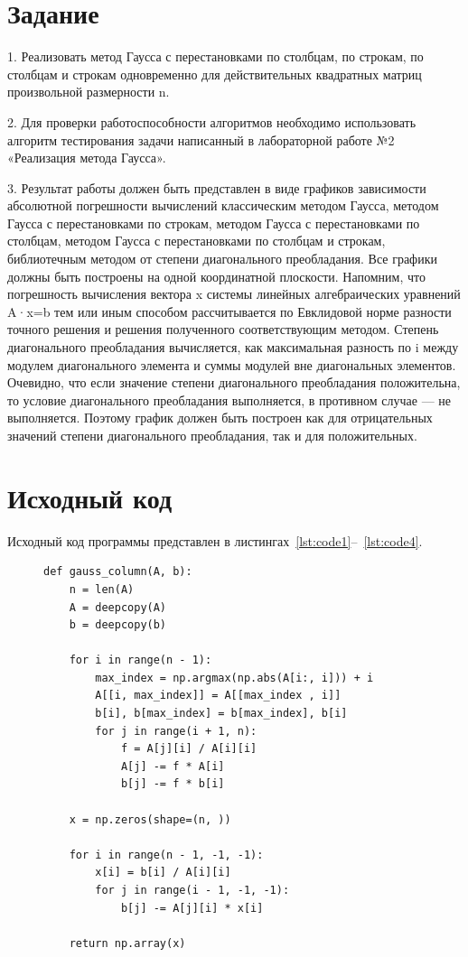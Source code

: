 \documentclass[a4paper, 14pt]{extarticle}
\begin{document}
\renewcommand{\ttdefault}{pcr}

\setlength{\tabcolsep}{3pt}
\newpage
\setcounter{page}{2}

\section{Задание}\label{Sect::task}
1. Реализовать метод Гаусса с перестановками по столбцам, по строкам,
по столбцам и строкам одновременно для действительных квадратных
матриц произвольной размерности n.

2. Для проверки работоспособности алгоритмов необходимо использовать
алгоритм тестирования задачи написанный в лабораторной работе №2
«Реализация метода Гаусса».

3. Результат работы должен быть представлен в виде графиков зависимости
абсолютной погрешности вычислений классическим методом Гаусса,
методом Гаусса с перестановками по строкам, методом Гаусса с
перестановками по столбцам, методом Гаусса с перестановками по
столбцам и строкам, библиотечным методом от степени диагонального
преобладания. Все графики должны быть построены на одной
координатной плоскости. Напомним, что погрешность вычисления
вектора x системы линейных алгебраических уравнений A·x=b тем или
иным способом рассчитывается по Евклидовой норме разности точного
решения и решения полученного соответствующим методом. Степень
диагонального преобладания вычисляется, как максимальная разность по
i между модулем диагонального элемента и суммы модулей вне
диагональных элементов. Очевидно, что если значение степени
диагонального преобладания положительна, то условие диагонального
преобладания выполняется, в противном случае — не выполняется.
Поэтому график должен быть построен как для отрицательных значений
степени диагонального преобладания, так и для положительных.
\newpage
\section{Исходный код}

Исходный код программы представлен в листингах~\ref{lst:code1}--~\ref{lst:code4}.

\begin{figure}[H]
\begin{lstlisting}[language={},caption={Метод Гаусса c выбором главного элемента по столбцу},label={lst:code1}]
def gauss_column(A, b):
    n = len(A)
    A = deepcopy(A)
    b = deepcopy(b)

    for i in range(n - 1):
        max_index = np.argmax(np.abs(A[i:, i])) + i
        A[[i, max_index]] = A[[max_index , i]]
        b[i], b[max_index] = b[max_index], b[i]
        for j in range(i + 1, n):
            f = A[j][i] / A[i][i]
            A[j] -= f * A[i]
            b[j] -= f * b[i]

    x = np.zeros(shape=(n, ))

    for i in range(n - 1, -1, -1):
        x[i] = b[i] / A[i][i]
        for j in range(i - 1, -1, -1):
            b[j] -= A[j][i] * x[i]

    return np.array(x)
\end{lstlisting}
\end{figure}
\end{document}
